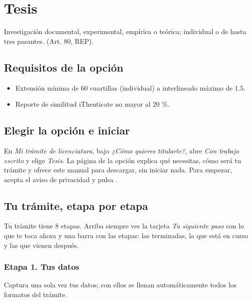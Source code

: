 \section{Tesis}
Investigación documental, experimental, empírica o teórica; individual o de hasta tres pasantes. (Art. 80, REP).

\subsection{Requisitos de la opción}
\begin{itemize}
  \item Extensión mínima de 60 cuartillas (individual) a interlineado máximo de 1.5.
  \item Reporte de similitud iThenticate no mayor al 20 \%.
\end{itemize}
\subsection{Elegir la opción e iniciar}
En \emph{Mi trámite de licenciatura}, bajo \emph{¿Cómo quieres titularte?}, abre \emph{Con trabajo escrito} y elige \emph{Tesis}. La página de la opción explica qué necesitas, cómo será tu trámite y ofrece este manual para descargar, sin iniciar nada. Para empezar, acepta el aviso de privacidad y pulsa .
\subsection{Tu trámite, etapa por etapa}
Tu trámite tiene 8 etapas. Arriba siempre ves la tarjeta \emph{Tu siguiente paso} con lo que te toca ahora y una barra con las etapas: las terminadas, la que está en curso y las que vienen después.
\subsubsection*{Etapa 1. Tus datos}
Captura una sola vez tus datos; con ellos se llenan automáticamente todos los formatos del trámite.

